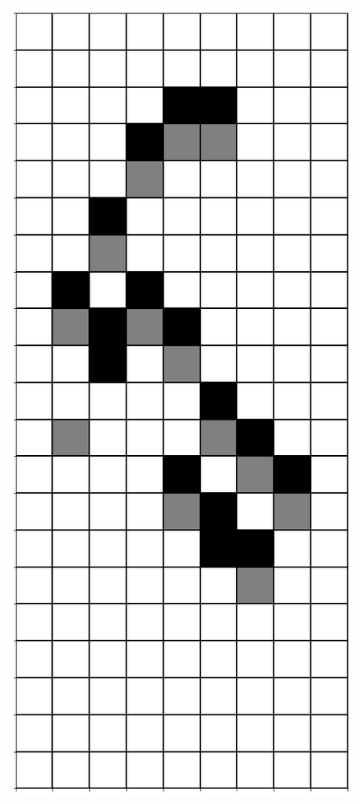 \documentclass[12pt]{article}
\numberwithin{figure}{section} %
\begin{document}
\begin{figure}[H]
\begin{subfigure}{0.19\textwidth}
     		\subcaption{}
   	\end{subfigure}
        	\begin{subfigure}{0.19\textwidth}
     		\centering
     		\includegraphics[width=\linewidth]{Section4/25.3}

\end{subfigure}
\end{figure}
\end{document}
